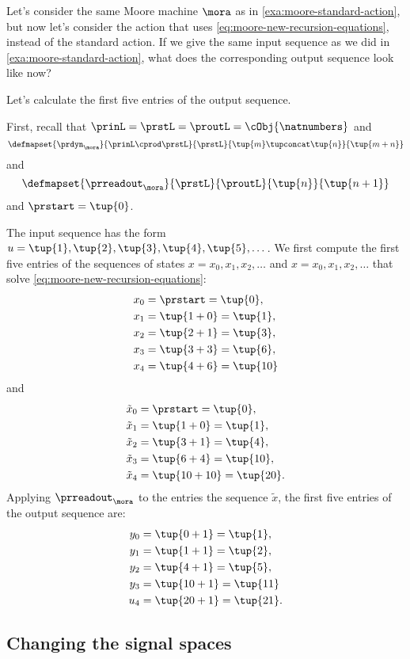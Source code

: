 \begin{example}
Let's consider the same Moore machine $\mora$ as in \cref{exa:moore-standard-action}, but now let's consider the action that uses \cref{eq:moore-new-recursion-equations}, instead of the standard action. If we give the same input sequence as we did in \cref{exa:moore-standard-action}, what does the corresponding output sequence look like now?

Let's calculate the first five entries of the output sequence. 

First, recall that $\prinL = \prstL = \proutL = \cObj{\natnumbers}$
and 
\begin{equation}
\defmapset{
\prdyn_\mora
}{
\prinL \cprod \prstL
}{
\prstL
}{
\tup{m} \tupconcat \tup{n}
}{
\tup{m + n}
}
\end{equation}
and 
\begin{equation}
\defmapset{
\prreadout_\mora
}{
\prstL
}{
\proutL
}{
\tup{n}
}{
\tup{n+1}
}
\end{equation}
and $\prstart = \tup{0}$. 

The input sequence has the form $u = \tup{1}, \tup{2}, \tup{3}, \tup{4}, \tup{5}, \dots$. We first compute the first five entries of the sequences of states $x = x_0, x_1, x_2, \dots$ and $x = x_0, x_1, x_2, \dots$ that solve \cref{eq:moore-new-recursion-equations}:
\begin{align*}
x_0 &= \prstart = \tup{0}, \\
x_1 &= \tup{1 + 0} = \tup{1}, \\
x_2 &= \tup{2 + 1} = \tup{3}, \\
x_3 &= \tup{3 + 3} = \tup{6}, \\
x_4 &= \tup{4 + 6} = \tup{10}
\end{align*}
and
\begin{align*}
\tilde x_0 &= \prstart = \tup{0}, \\
\tilde x_1 &= \tup{1 + 0} = \tup{1}, \\
\tilde x_2 &= \tup{3 + 1} = \tup{4}, \\
\tilde x_3 &= \tup{6 + 4} = \tup{10}, \\
\tilde x_4 &= \tup{10 + 10} = \tup{20}.
\end{align*}
Applying $\prreadout_\mora$ to the entries the sequence $\tilde x$, the first five entries of the output sequence are:
\begin{align*}
y_0 &= \tup{0 + 1} = \tup{1}, \\
y_1 &= \tup{1 + 1} = \tup{2}, \\
y_2 &= \tup{4 + 1} = \tup{5}, \\
y_3 &= \tup{10 + 1} = \tup{11} \\
u_4 &= \tup{20 + 1} = \tup{21}.
\end{align*}
\end{example}




\subsection{Changing the signal spaces}



